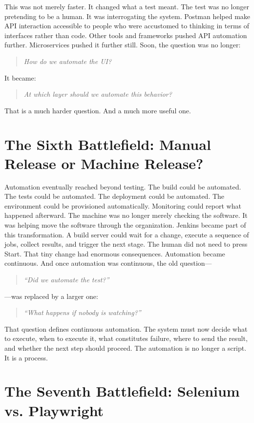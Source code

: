 \documentclass[11pt,twoside]{book}
\begin{document}
This was not merely faster.
It changed what a test meant.
The test was no longer pretending to be a human.
It was interrogating the system.
Postman helped make API interaction accessible to people who were accustomed to thinking in terms of interfaces rather than code.
Other tools and frameworks pushed API automation further.
Microservices pushed it further still.
Soon, the question was no longer:
\begin{quote}
\emph{How do we automate the UI?}
\end{quote}
It became:
\begin{quote}
\emph{At which layer should we automate this behavior?}
\end{quote}
That is a much harder question.
And a much more useful one.

\section*{The Sixth Battlefield: Manual Release or Machine Release?}

Automation eventually reached beyond testing.
The build could be automated.
The tests could be automated.
The deployment could be automated.
The environment could be provisioned automatically.
Monitoring could report what happened afterward.
The machine was no longer merely checking the software.
It was helping move the software through the organization.
Jenkins became part of this transformation.
A build server could wait for a change, execute a sequence of jobs, collect results, and trigger the next stage.
The human did not need to press Start.
That tiny change had enormous consequences.
Automation became continuous.
And once automation was continuous, the old question---
\begin{quote}
\emph{``Did we automate the test?''}
\end{quote}
---was replaced by a larger one:
\begin{quote}
\emph{``What happens if nobody is watching?''}
\end{quote}
That question defines continuous automation.
The system must now decide what to execute, when to execute it, what constitutes failure, where to send the result, and whether the next step should proceed.
The automation is no longer a script.
It is a process.

\section*{The Seventh Battlefield: Selenium vs. Playwright}
\end{document}
